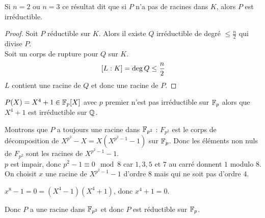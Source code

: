 \begin{remarque}
	Si $n = 2$ ou $n = 3$ ce résultat dit que si $P$ n'a pas de racines dans $K$, alors $P$ est irréductible.
\end{remarque}


\begin{proof}
	Soit $P$ réductible sur $K$. Alors il existe $Q$ irréductible de degré $\leq \frac{n}{2}$ qui divise $P$.\\
	Soit un corps de rupture pour $Q$ sur $K$.\\
	$$[ L : K ] = \deg Q \leq \frac{n}{2}$$
	$L$ contient une racine de $Q$ et donc une racine de $P$.
\end{proof}



\begin{example}
	$P(X) = X^4 + 1 \in \mathbb{F}_p[X]$ avec $p$ premier n'est pas irréductible sur $\mathbb{F}_p$ alors que $X^4 + 1$ est irréductible sur $\mathbb{Q}$.

	Montrons que $P$ a toujours une racine dans $\mathbb{F}_{p^2}$ :
	$F_{p^2}$ est le corps de décomposition de $X^{p^2} - X = X (X^{p^2-1} - 1)$ sur $\mathbb{F}_p$.
	Donc les éléments non nuls de $F_{p^2}$ sont les racines de $X^{p^2-1} - 1$.\\
	$p$ est impair, donc $p^2 - 1 \equiv 0 \mod 8$ car $1,3,5$ et $7$ au carré donnent $1$ modulo $8$.\\

	On choisit $x$ une racine de $X^{p^2-1} - 1$ d'ordre $8$ mais qui ne soit pas d'ordre $4$.

	$x^8-1 = 0 = (X^4-1)(X^4+1)$, donc $x^4 + 1 = 0$.

	Donc $P$ a une racine dans $\mathbb{F}_{p^2}$ et donc $P$ est réductible sur $\mathbb{F}_p$.
\end{example}



